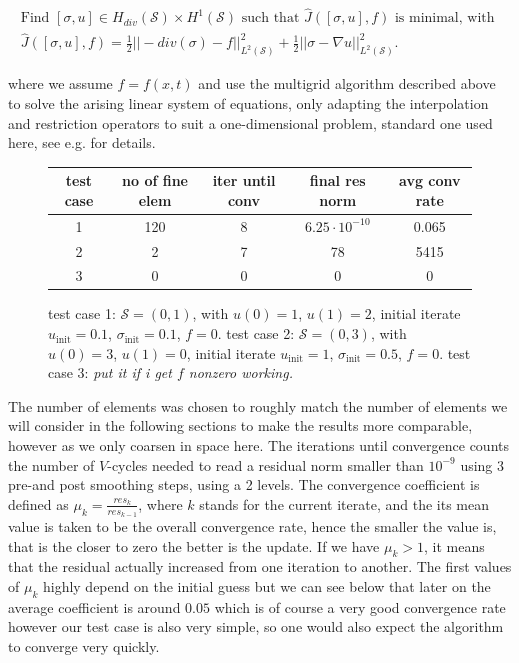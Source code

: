\documentclass[../draft_1.tex]{subfiles}
\begin{document}
\begin{ceqn}
	\begin{equation}
	\begin{aligned}
	\text{Find } [\sigma, u] \in H_{div}(\mathcal{S}) \times H^1(\mathcal{S}) \text{ such that } \hat{J}([\sigma, u], f) \text{ is minimal, with } \\
\hat{J}([\sigma, u], f) = \frac{1}{2}|| - div(\sigma) - f ||_{L^2(\mathcal{S})}^2  + \frac{1}{2} || \sigma - \nabla u ||_{L^2(\mathcal{S})}^2.
	\end{aligned}
	\end{equation}
\end{ceqn}
where we assume $f = f(x,t)$ and use the multigrid algorithm described above to solve the arising linear system of equations, only adapting the interpolation and restriction operators to suit a one-dimensional problem, standard one used here, see e.g. \cite{briggs2000multigrid} for details.

\begin{figure}
	\begin{center}
		\begin{tabular}{||c | c | c | c | c ||} 
			\hline
			test case & no of fine elem & iter until conv & final res norm & avg conv rate \\ [0.5ex] 
			\hline\hline
			1 & 120 & 8 & $6.25 \cdot 10^{-10}$ &  0.065 \\ 
			\hline
			2 & 2 & 7 & 78 & 5415   \\
			\hline
			3 & 0 & 0 & 0 & 0  \\
			\hline
		\end{tabular}
	\end{center}
	\caption{test case 1: $\mathcal{S} = (0,1)$, with $u(0) = 1$, $u(1) = 2$, initial iterate $u_{\text{init}} = 0.1$, $\sigma_{\text{init}} = 0.1$, $f = 0$.
	test case 2: $\mathcal{S} = (0,3)$, with $u(0) = 3$, $u(1) = 0$, initial iterate $u_{\text{init}} = 1$, $\sigma_{\text{init}} = 0.5$, $f = 0$. test case 3: \textit{put it if i get $f$ nonzero working.} }
\end{figure}

The number of elements was chosen to roughly match the number of elements we will consider in the following sections to make the results more comparable, however as we only coarsen in space here. The iterations until convergence counts the number of $V$-cycles needed to read a residual norm smaller than $10^{-9}$ using 3 pre-and post smoothing steps, using a 2 levels. The convergence coefficient is defined as $\mu_k = \frac{res_k}{res_{k-1}}$, where $k$ stands for the current iterate, and the its mean value is taken to be the overall convergence rate, hence the smaller the value is, that is the closer to zero the better is the update. If we have $\mu_k > 1$, it means that the residual actually increased from one iteration to another. The first values of $\mu_k$ highly depend on the initial guess but we can see below that later on the average coefficient is around $0.05$ which is of course a very good convergence rate however our test case is also very simple, so one would also expect the algorithm to converge very quickly.
\end{document}
